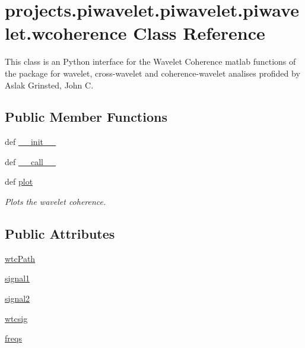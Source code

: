 \hypertarget{classprojects_1_1piwavelet_1_1piwavelet_1_1piwavelet_1_1wcoherence}{\section{projects.\-piwavelet.\-piwavelet.\-piwavelet.\-wcoherence Class Reference}
\label{classprojects_1_1piwavelet_1_1piwavelet_1_1piwavelet_1_1wcoherence}
}


This class is an Python interface for the Wavelet Coherence matlab functions of the package for wavelet, cross-\/wavelet and coherence-\/wavelet analises profided by Aslak Grinsted, John C.  


\subsection*{Public Member Functions}
\begin{DoxyCompactItemize}
\item 
def \hyperlink{classprojects_1_1piwavelet_1_1piwavelet_1_1piwavelet_1_1wcoherence_a80ad1589ead857a4b8e258c975142977}{\-\_\-\-\_\-init\-\_\-\-\_\-}
\item 
def \hyperlink{classprojects_1_1piwavelet_1_1piwavelet_1_1piwavelet_1_1wcoherence_a5d7f2882ef814b2d31731b0a757d4688}{\-\_\-\-\_\-call\-\_\-\-\_\-}
\item 
def \hyperlink{classprojects_1_1piwavelet_1_1piwavelet_1_1piwavelet_1_1wcoherence_a4f8485168fe986bcb963bf19b2689840}{plot}
\begin{DoxyCompactList}\small\item\em Plots the wavelet coherence. \end{DoxyCompactList}\end{DoxyCompactItemize}
\subsection*{Public Attributes}
\begin{DoxyCompactItemize}
\item 
\hyperlink{classprojects_1_1piwavelet_1_1piwavelet_1_1piwavelet_1_1wcoherence_a25dfbcf50c95984383d2bac6f111ebbd}{wtc\-Path}
\item 
\hyperlink{classprojects_1_1piwavelet_1_1piwavelet_1_1piwavelet_1_1wcoherence_a0f1a26d08a24a960d5aadda2a7132435}{signal1}
\item 
\hyperlink{classprojects_1_1piwavelet_1_1piwavelet_1_1piwavelet_1_1wcoherence_af647f5f8dff85e72debd8f0be20708a8}{signal2}
\item 
\hyperlink{classprojects_1_1piwavelet_1_1piwavelet_1_1piwavelet_1_1wcoherence_a87dafc50e3d111da1df10d1a8a72586d}{wtcsig}
\item 
\hyperlink{classprojects_1_1piwavelet_1_1piwavelet_1_1piwavelet_1_1wcoherence_a04c6e1e9931771326ad92523d1f2b03a}{freqs}
\end{DoxyCompactItemize}


